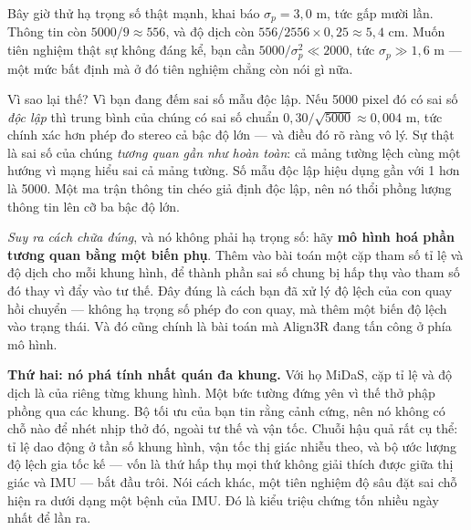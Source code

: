 \documentclass[../../deep_learning.tex]{subfiles}
\begin{document}
Bây giờ thử hạ trọng số thật mạnh, khai báo \(\sigma_p = 3{,}0\) m, tức gấp mười lần. Thông tin còn \(5000/9 \approx 556\), và độ dịch còn \(556/2556 \times 0{,}25 \approx 5{,}4\) cm. Muốn tiên nghiệm thật sự không đáng kể, bạn cần \(5000/\sigma_p^2 \ll 2000\), tức \(\sigma_p \gg 1{,}6\) m --- một mức bất định mà ở đó tiên nghiệm chẳng còn nói gì nữa.

Vì sao lại thế? Vì bạn đang đếm sai số mẫu độc lập. Nếu 5000 pixel đó có sai số \emph{độc lập} thì trung bình của chúng có sai số chuẩn \(0{,}30/\sqrt{5000} \approx 0{,}004\) m, tức chính xác hơn phép đo stereo cả bậc độ lớn --- và điều đó rõ ràng vô lý. Sự thật là sai số của chúng \emph{tương quan gần như hoàn toàn}: cả mảng tường lệch cùng một hướng vì mạng hiểu sai cả mảng tường. Số mẫu độc lập hiệu dụng gần với 1 hơn là 5000. Một ma trận thông tin chéo giả định độc lập, nên nó thổi phồng lượng thông tin lên cỡ ba bậc độ lớn.

\emph{Suy ra cách chữa đúng}, và nó không phải hạ trọng số: hãy \textbf{mô hình hoá phần tương quan bằng một biến phụ}. Thêm vào bài toán một cặp tham số tỉ lệ và độ dịch cho mỗi khung hình, để thành phần sai số chung bị hấp thụ vào tham số đó thay vì đẩy vào tư thế. Đây đúng là cách bạn đã xử lý độ lệch của con quay hồi chuyển --- không hạ trọng số phép đo con quay, mà thêm một biến độ lệch vào trạng thái.
Và đó cũng chính là bài toán mà Align3R đang tấn công ở phía mô hình.

\textbf{Thứ hai: nó phá tính nhất quán đa khung.} Với họ MiDaS, cặp tỉ lệ và độ dịch là của riêng từng khung hình. Một bức tường đứng yên vì thế thở phập phồng qua các khung. Bộ tối ưu của bạn tin rằng cảnh cứng, nên nó không có chỗ nào để nhét nhịp thở đó, ngoài tư thế và vận tốc. Chuỗi hậu quả rất cụ thể: tỉ lệ dao động ở tần số khung hình, vận tốc thị giác nhiễu theo, và bộ ước lượng độ lệch gia tốc kế --- vốn là thứ hấp thụ mọi thứ không giải thích được giữa thị giác và IMU --- bắt đầu trôi. Nói cách khác, một tiên nghiệm độ sâu đặt sai chỗ hiện ra dưới dạng một bệnh của IMU. Đó là kiểu triệu chứng tốn nhiều ngày nhất để lần ra.
\end{document}

